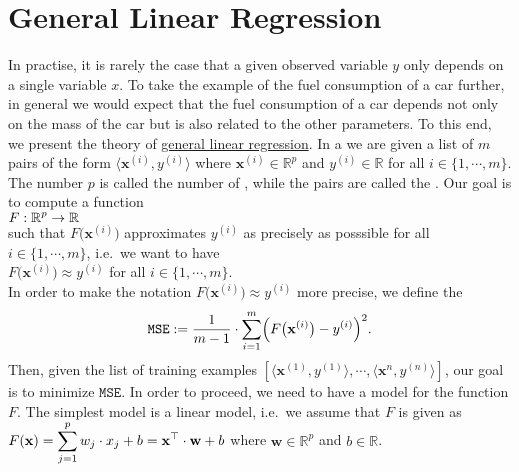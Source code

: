 \section{General Linear Regression}
In practise, it is rarely the case that a given observed variable $y$ only depends on a single variable $x$.
To take the example of the fuel consumption of a car further, in general we would expect that the fuel consumption
of a car depends not only on the mass of the car but is also related to the other parameters.  
To this end, we present the theory of   
\href{https://en.wikipedia.org/wiki/Linear_regression}{general linear regression}.
In a  we are given a list of $m$ pairs of the form $\langle\mathbf{x}^{(i)}, y^{(i)} \rangle$ 
where $\mathbf{x}^{(i)} \in \mathbb{R}^p$ and $y^{(i)} \in \mathbb{R}$ for all $i \in \{1,\cdots,m\}$.  The
number $p$ is called the number of , while the pairs are called the .
Our goal is to compute a function 
\\[0.2cm]
\hspace*{1.3cm}
$\displaystyle F:\mathbb{R}^p \rightarrow \mathbb{R}$
\\[0.2cm]  
such that $F\bigl(\mathbf{x}^{(i)}\bigr)$ approximates  $y^{(i)}$ as precisely as posssible
for all $i\in\{1,\cdots,m\}$, i.e.~we want to have
\\[0.2cm]
\hspace*{1.3cm}
$F\bigl(\mathbf{x}^{(i)}\bigr) \approx y^{(i)}$ \quad for all $i\in\{1,\cdots,m\}$.
\\[0.2cm]
In order to make the notation $F\bigl(\mathbf{x}^{(i)}\bigr) \approx y^{(i)}$ more precise, we
define the  
\begin{equation}
  \label{eq:squared-error-1}
  \mathtt{MSE} := \frac{1}{m-1} \cdot \sum\limits_{i=1}^{m} \Bigl(F\bigl(\mathbf{x}^{(i)}\bigr) - y^{(i)}\Bigr)^2. 
\end{equation}
Then, given the list of training examples $[\langle \mathbf{x}^{(1)}, y^{(1)} \rangle, \cdots, \langle
\mathbf{x}^{n}, y^{(n)} \rangle]$, our goal is to minimize $\mathtt{MSE}$.  
In order to proceed, we need to have a model for the function $F$.  The simplest model is a linear
model, i.e.~we assume that $F$ is given as 
\\[0.2cm]
\hspace*{1.3cm}
$\displaystyle F(\mathbf{x}) = \sum\limits_{j=1}^p w_j \cdot x_j + b = \mathbf{x}^\top \cdot \mathbf{w} + b$ \quad where $\mathbf{w} \in \mathbb{R}^p$ and $b\in\mathbb{R}$.
\\[0.2cm]

